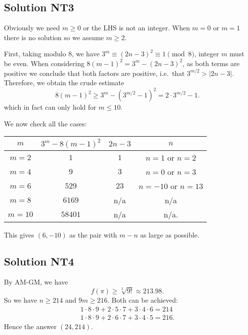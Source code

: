 \documentclass[11pt]{scrartcl}
\begin{document}
\subsection*{Solution NT3}
Obviously we need $m \ge 0$ or the LHS is not an integer.
When $m = 0$ or $m = 1$ there is no solution so we assume $m \ge 2$.

First, taking modulo $8$, we have $3^m \equiv (2n-3)^2 \equiv 1 \pmod 8$,
integer $m$ must be even.
When considering $8(m-1)^2 = 3^m - (2n-3)^2$,
as both terms are positive
we conclude that both factors are positive,
i.e.\ that $3^{m/2} > |2n-3|$.
Therefore, we obtain the crude estimate
\[ 8(m-1)^2 \ge 3^m - (3^{m/2}-1)^2 = 2 \cdot 3^{m/2} - 1. \]
which in fact can only hold for $m \le 10$.

We now check all the cases:
\begin{center}
\begin{tabular}[h]{cccc}
	$m$ & $3^m - 8(m-1)^2$ & $2n-3$ & $n$ \\ \hline
	$m=2$ & $1$ & $1$ & $n=1$ or $n=2$ \\
	$m=4$ & $9$ & $3$ & $n=0$ or $n=3$ \\
	$m=6$ & $529$ & $23$ & $n=-10$ or $n=13$ \\
	$m=8$ & $6169$ & n/a & n/a \\
	$m=10$ & $58401$ & n/a & n/a. \\
\end{tabular}
\end{center}
This gives $(6,-10)$ as the pair with $m-n$ as large as possible.

\subsection*{Solution NT4}
By AM-GM, we have
\[ f(\pi) \ge \sqrt[3]{9!} \approx 213.98. \]
So we have $n \ge 214$ and $9m \ge 216$.
Both can be achieved:
\begin{align*}
	1 \cdot 8 \cdot 9 + 2 \cdot 5 \cdot 7 + 3 \cdot 4 \cdot 6 = 214 \\
	1 \cdot 8 \cdot 9 + 2 \cdot 6 \cdot 7 + 3 \cdot 4 \cdot 5 = 216.
\end{align*}
Hence the answer $(24, 214)$.
\end{document}

